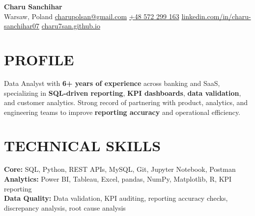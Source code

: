 \documentclass[letterpaper,10pt]{article}
\begin{document}
\color{bodytext}

\begin{center}
    {\fontsize{24pt}{28pt}\selectfont \textbf{\color{primary} Charu Sanchihar}} \\[4pt]
    \small \color{bodytext}
    Warsaw, Poland \enspace\textbar\enspace
    \href{mailto:charupolsan@gmail.com}{charupolsan@gmail.com} \enspace\textbar\enspace
    \href{tel:+48572299163}{+48 572 299 163} \enspace\textbar\enspace
    \href{https://linkedin.com/in/charu-sanchihar07}{linkedin.com/in/charu-sanchihar07} \enspace\textbar\enspace
    \href{https://charu7san.github.io}{charu7san.github.io}
\end{center}
\vspace{-4pt}

\section{PROFILE}
\noindent\small
Data Analyst with \textbf{6+ years of experience} across banking and SaaS, specializing in \textbf{SQL-driven reporting}, \textbf{KPI dashboards}, \textbf{data validation}, and customer analytics. Strong record of partnering with product, analytics, and engineering teams to improve \textbf{reporting accuracy} and operational efficiency.

\section{TECHNICAL SKILLS}
\small
\noindent\textbf{Core:} SQL, Python, REST APIs, MySQL, Git, Jupyter Notebook, Postman \\
\textbf{Analytics:} Power BI, Tableau, Excel, pandas, NumPy, Matplotlib, R, KPI reporting \\
\textbf{Data Quality:} Data validation, KPI auditing, reporting accuracy checks, discrepancy analysis, root cause analysis

\end{document}
